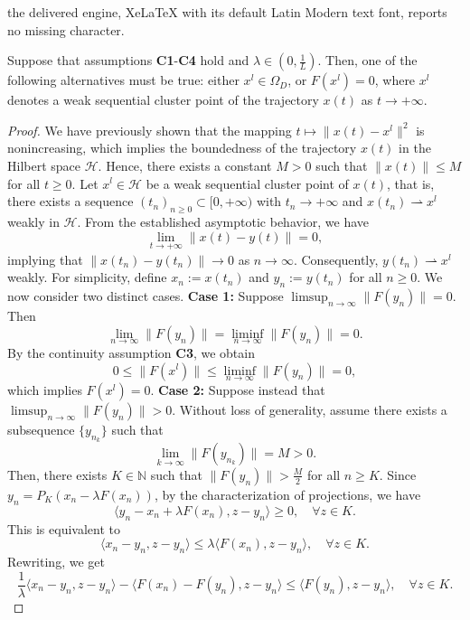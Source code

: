 \documentclass[10pt,a4paper]{amsart}
\begin{document}
the delivered engine, XeLaTeX with its default Latin Modern text font, reports no missing character.
\begin{proposition}\label{p3.5}
Suppose that assumptions \textbf{C1}-\textbf{C4} hold and $\lambda\in(0,\frac{1}{L})$. Then, one of the following alternatives must be true: either \( x^l \in \Omega_{D} \), or \( F(x^l) = 0 \), where \( x^l \) denotes a weak sequential cluster point of the trajectory \( x(t) \) as \( t \to +\infty \).
\end{proposition}

\begin{proof}
We have previously shown that the mapping \( t \mapsto \|x(t) - x^l\|^2 \) is nonincreasing, which implies the boundedness of the trajectory \( x(t) \) in the Hilbert space \( \mathcal{H} \). Hence, there exists a constant \( M > 0 \) such that \( \|x(t)\| \leq M \) for all \( t \geq 0 \).
\vskip 2mm 
Let \( x^l \in \mathcal{H} \) be a weak sequential cluster point of \( x(t) \), that is, there exists a sequence \( (t_n)_{n \geq 0} \subset [0, +\infty) \) with \( t_n \to +\infty \) and \( x(t_n) \rightharpoonup x^l \) weakly in \( \mathcal{H} \). From the established asymptotic behavior, we have
\[
\lim_{t \to +\infty} \|x(t) - y(t)\| = 0,
\]
implying that \( \|x(t_n) - y(t_n)\| \to 0 \) as \( n \to \infty \). Consequently, \( y(t_n) \rightharpoonup x^l \) weakly.
\vskip 2mm 
For simplicity, define \( x_n := x(t_n) \) and \( y_n := y(t_n) \) for all \( n \geq 0 \). We now consider two distinct cases.
\vskip 2mm
\textbf{Case 1:} Suppose \( \limsup_{n \to \infty} \|F(y_n)\| = 0 \). Then
\[
\lim_{n \to \infty} \|F(y_n)\| = \liminf_{n \to \infty} \|F(y_n)\| = 0.
\]
By the continuity assumption \textbf{C3}, we obtain
\[
0 \leq \|F(x^l)\| \leq \liminf_{n \to \infty} \|F(y_n)\| = 0,
\]
which implies \( F(x^l) = 0 \).
\vskip 2mm
\textbf{Case 2:} Suppose instead that \( \limsup_{n \to \infty} \|F(y_n)\| > 0 \). Without loss of generality, assume there exists a subsequence \( \{y_{n_k}\} \) such that
\[
\lim_{k \to \infty} \|F(y_{n_k})\| = M > 0.
\]
Then, there exists \( K \in \mathbb{N} \) such that \( \|F(y_n)\| > \frac{M}{2} \) for all \( n \geq K \). Since \( y_n = P_K(x_n - \lambda F(x_n)) \), by the characterization of projections, we have
\[
\langle y_n - x_n + \lambda F(x_n), z - y_n \rangle \geq 0, \quad \forall z \in K.
\]
This is equivalent to
\[
\langle x_n - y_n, z - y_n \rangle \leq \lambda \langle F(x_n), z - y_n \rangle, \quad \forall z \in K.
\]
Rewriting, we get
\[
\frac{1}{\lambda} \langle x_n - y_n, z - y_n \rangle - \langle F(x_n) - F(y_n), z - y_n \rangle \leq \langle F(y_n), z - y_n \rangle, \quad \forall z \in K.
\]


\end{proof}
\end{document}
